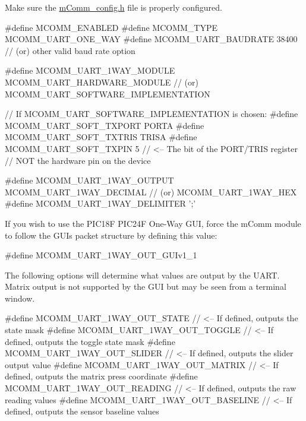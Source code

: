 \begin{DoxyEnumerate}
\item Make sure the \hyperlink{m_comm__config_8h}{m\+Comm\+\_\+config.\+h} file is properly configured. 
\begin{DoxyCode}
\textcolor{preprocessor}{#define MCOMM\_ENABLED}
\textcolor{preprocessor}{#define MCOMM\_TYPE                    MCOMM\_UART\_ONE\_WAY}
\textcolor{preprocessor}{#define MCOMM\_UART\_BAUDRATE           38400                       // (or) other valid baud rate option}
\end{DoxyCode}
 
\begin{DoxyCode}
\textcolor{preprocessor}{#define MCOMM\_UART\_1WAY\_MODULE        MCOMM\_UART\_HARDWARE\_MODULE  // (or)
       MCOMM\_UART\_SOFTWARE\_IMPLEMENTATION}

    \textcolor{comment}{// If MCOMM\_UART\_SOFTWARE\_IMPLEMENTATION is chosen:}
\textcolor{preprocessor}{    #define MCOMM\_UART\_SOFT\_TXPORT        PORTA}
\textcolor{preprocessor}{    #define MCOMM\_UART\_SOFT\_TXTRIS        TRISA   }
\textcolor{preprocessor}{    #define MCOMM\_UART\_SOFT\_TXPIN         5       // <-- The bit of the PORT/TRIS register}
\textcolor{preprocessor}{                                                  //     NOT the hardware pin on the device}
\end{DoxyCode}
 
\begin{DoxyCode}
\textcolor{preprocessor}{#define MCOMM\_UART\_1WAY\_OUTPUT        MCOMM\_UART\_1WAY\_DECIMAL     // (or) MCOMM\_UART\_1WAY\_HEX        }
\textcolor{preprocessor}{#define MCOMM\_UART\_1WAY\_DELIMITER     ';'                         }
\end{DoxyCode}
 If you wish to use the P\+I\+C18\+F P\+I\+C24\+F One-\/\+Way G\+U\+I, force the m\+Comm module to follow the G\+U\+I\textquotesingle{}s packet structure by defining this value\+: 
\begin{DoxyCode}
\textcolor{preprocessor}{#define MCOMM\_UART\_1WAY\_OUT\_GUIv1\_1}
\end{DoxyCode}
 The following options will determine what values are output by the U\+A\+R\+T. Matrix output is not supported by the G\+U\+I but may be seen from a terminal window. 
\begin{DoxyCode}
\textcolor{preprocessor}{#define MCOMM\_UART\_1WAY\_OUT\_STATE             // <-- If defined, outputs the state mask}
\textcolor{preprocessor}{#define MCOMM\_UART\_1WAY\_OUT\_TOGGLE            // <-- If defined, outputs the toggle state mask}
\textcolor{preprocessor}{#define MCOMM\_UART\_1WAY\_OUT\_SLIDER            // <-- If defined, outputs the slider output value}
\textcolor{preprocessor}{#define MCOMM\_UART\_1WAY\_OUT\_MATRIX            // <-- If defined, outputs the matrix press coordinate}
\textcolor{preprocessor}{#define MCOMM\_UART\_1WAY\_OUT\_READING           // <-- If defined, outputs the raw reading values}
\textcolor{preprocessor}{#define MCOMM\_UART\_1WAY\_OUT\_BASELINE          // <-- If defined, outputs the sensor baseline values}
\end{DoxyCode}



\end{DoxyEnumerate}
